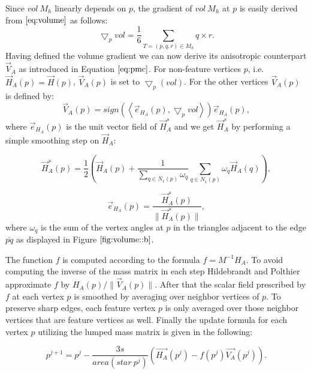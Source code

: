\documentclass[11pt]{article}
\begin{document}
Since $vol \ M_h$ linearly depends on $p$, the gradient of $vol \ M_h$ at $p$ is easily derived from $\ref{eq:volume}$ as follows:
\begin{equation}
\bigtriangledown_p vol = \frac{1}{6}\sum\limits_{T=(p, q, r) \in M_h}q \times r.
\end{equation}
Having defined the volume gradient we can now derive its anisotropic counterpart $\vec{V}_A$ as introduced in Equation $\ref{eq:pmc}$. For non-feature vertices $p$, i.e. $\vec{H}_A(p) = \vec{H}(p)$, $\vec{V}_A(p)$ is set to $\bigtriangledown_p(vol)$. For the other vertices $\vec{V}_A(p)$ is defined by:
\begin{equation}
\vec{V}_A(p) = sign\left( \left\langle \vec{e}_{H_A}(p), \bigtriangledown_p vol\right\rangle \right) \vec{e}_{H_A}(p),
\end{equation}
where $\vec{e}_{H_A}(p)$ is the unit vector field of $\vec{H}^s_A$ and we get $\vec{H}^s_A$ by performing a simple smoothing step on $\vec{H}_A$:

\begin{equation}
\vec{H}^s_A(p) = \frac{1}{2}\left( \vec{H}_A(p) + \dfrac{1}{\sum\limits_{q \in N_1(p)} \omega_q}\sum\limits_{q \in N_1(p)}\omega_q\vec{H}_A(q) \right) ,
\end{equation}

\begin{equation}
\vec{e}_{H_A}(p) = \dfrac{\vec{H}^s_A(p)}{\parallel \vec{H}^s_A(p) \parallel},
\end{equation}
where $\omega_q$ is the sum of the vertex angles at $p$ in the triangles adjacent to the edge $\bar{pq}$ as displayed in Figure $\ref{fig:volume::b}$.

The function $f$ is computed according to the formula $f = M^{-1}H_A$. To avoid computing the inverse of the mass matrix in each step Hildebrandt and Polthier \cite{Hildebrandt04anisotropicfiltering} approximate $f$ by $H_A(p)/\parallel \vec{V}_A(p) \parallel$. After that the scalar field prescribed by $f$ at each vertex $p$ is smoothed by averaging over neighbor vertices of $p$. To preserve sharp edges, each feature vertex $p$ is only averaged over those neighbor vertices that are feature vertices as well. Finally the update formula for each vertex $p$ utilizing the lumped mass matrix is given in the following:

\begin{equation}
p^{j+1} = p^{j} - \dfrac{3s}{area(star\ p^j)}(\vec{H_A}(p^j) - f(p^j)\vec{V_A}(p^j)).
\end{equation}
\end{document}
